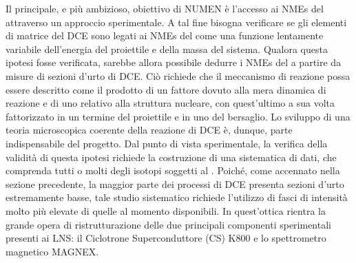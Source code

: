 Il principale, e più ambizioso, obiettivo di NUMEN è l'accesso ai NMEs del \doppiobeta{} attraverso un approccio sperimentale. A tal fine bisogna verificare se gli elementi di matrice del DCE sono legati ai NMEs del \doppiobeta{} come una funzione lentamente variabile dell'energia del proiettile e della massa del sistema.
Qualora questa ipotesi fosse verificata, sarebbe allora possibile dedurre i NMEs del \doppiobeta{} a partire da misure di sezioni d'urto di DCE.
Ciò richiede che il meccanismo di reazione possa essere descritto come il prodotto di un fattore dovuto alla mera dinamica di reazione e di uno relativo alla struttura nucleare, con quest'ultimo a sua volta fattorizzato in un termine del proiettile e in uno del bersaglio.
Lo sviluppo di una teoria microscopica coerente della reazione di DCE è, dunque, parte indispensabile del progetto. 
Dal punto di vista sperimentale, la verifica della validità di questa ipotesi richiede la costruzione di una sistematica di dati, che comprenda tutti o molti degli isotopi soggetti al \doppiobeta.
Poiché, come accennato nella sezione precedente, la maggior parte dei processi di DCE presenta sezioni d'urto estremamente basse, tale studio sistematico richiede l'utilizzo di fasci di intensità molto più elevate di quelle al momento disponibili.
In quest'ottica rientra la grande opera di ristrutturazione delle due principali componenti sperimentali presenti ai LNS: il Ciclotrone Superconduttore (CS) K800 e lo spettrometro magnetico MAGNEX.

